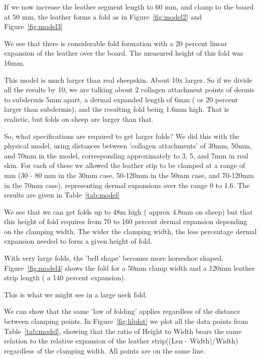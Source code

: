 \documentclass[titlepage]{article}  %
\begin{document}
If we now increase the leather segment length to 60 mm, and clamp to the board at 50 mm, the leather forms a fold as in Figure~\ref{fig:model2} and Figure~\ref{fig:model3}


We see that there is considerable fold formation with a 20 percent linear expansion of the leather over the board. The measured height of this fold was 16mm.

This model is much larger than real sheepskin. About 10x larger. So if we divide all the results by 10, we are talking about 2 collagen attachment points of dermis to subdermis 5mm apart, a dermal expanded length of 6mm ( or 20 percent larger than subdermis), and the resulting fold being 1.6mm high. That is realistic, but folds on sheep are larger than that. 

So, what specifications are required to get larger folds? We did this with the physical model, using distances between 'collagen attachments' of 30mm, 50mm, and 70mm in the model, corresponding approximately to 3, 5, and 7mm in real skin. For each of these we allowed the leather stip to be clamped at a range of mm (30 - 80 mm in the 30mm case, 50-120mm in the 50mm case, and 70-120mm in the 70mm case), representing dermal expansions over the range 0 to 1.6. The results are given in Table~\ref{tab:model}

 We see that we can get folds up to 48m high ( approx 4.8mm on sheep)  but that this height of fold requires from 70 to 160 percent dermal expansion depending on the clamping width. The wider the clamping width, the less percentage dermal expansion needed to form a given height of fold.

With very large folds, the 'bell shape' becomes more horseshoe shaped. Figure~\ref{fig:model4} shows the fold for a 50mm clamp width and a 120mm leather strip length ( a 140 percent expansion).

This is what we might see in a large neck fold.

We can show that the same 'law of folding' applies regardless of the distance between clamping points. In Figure~\ref{fig:hlplot} we plot all the data points from Table~\ref{tab:model}, showing that the ratio of Height to Width bears the same relation to the relative expansion of the leather strip((Len - Width)/Width) regardless of the clamping width. All points are on the same line.

 
\end{document}
